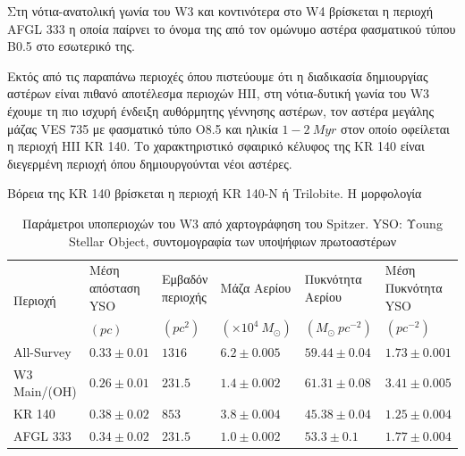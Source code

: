 \documentclass[a4paper,12pt]{memoir}
\newcommand{\e}[1]{\times 10^{#1}}
\begin{document}
Στη νότια-ανατολική γωνία του W3 και κοντινότερα στο W4 βρίσκεται η περιοχή AFGL 333 η οποία παίρνει το όνομα της από τον ομώνυμο αστέρα φασματικού τύπου B0.5 στο εσωτερικό της. 

Εκτός από τις παραπάνω περιοχές όπου πιστεύουμε ότι η διαδικασία δημιουργίας αστέρων είναι πιθανό αποτέλεσμα περιοχών HII, στη νότια-δυτική γωνία του W3 έχουμε τη πιο ισχυρή ένδειξη αυθόρμητης γέννησης αστέρων, τον αστέρα μεγάλης μάζας VES 735 με φασματικό τύπο O8.5 και ηλικία $1-2 \ Myr$ στον οποίο οφείλεται η περιοχή HII KR 140. Το χαρακτηριστικό σφαιρικό κέλυφος της KR 140 είναι διεγερμένη περιοχή όπου δημιουργούνται νέοι αστέρες. 

Βόρεια της KR 140 βρίσκεται η περιοχή KR 140-N ή Trilobite. Η μορφολογία 


\begin{table}
	\caption{Παράμετροι υποπεριοχών του W3 από χαρτογράφηση του Spitzer. YSO: Υoung Stellar Object, συντομογραφία των υποψήφιων πρωτοαστέρων}
	\begin{tabular}{p{} p{2.5cm} p{1.5cm} p{2cm} p{2.2cm} p{2.5cm}}
		\toprule
		\multirow{2}{*}{Περιοχή} & Μέση απόσταση YSO & Εμβαδόν περιοχής & Μάζα Αερίου & Πυκνότητα Αερίου & Μέση Πυκνότητα YSO \\ 
		&  $(pc)$ & $(pc^2)$ & $(\e{4} \ M_{\odot})$ & $(M_{\odot} \ pc^{-2})$ & $ (pc^{-2}) $ \\
		\midrule
		All-Survey & $0.33 \pm 0.01$ & $1316$ & $6.2\pm0.005$ & $59.44\pm 0.04$ & $1.73\pm 0.001$ \\
	  W3 Main/(OH) & $0.26 \pm 0.01$ & $231.5$ & $1.4\pm0.002$ & $61.31\pm 0.08$ & $3.41\pm 0.005$ \\
	  KR 140 & $0.38 \pm 0.02$ & $853$ & $3.8\pm0.004$ & $45.38\pm 0.04$ & $1.25\pm 0.004$ \\
	  AFGL 333 & $0.34 \pm 0.02$ & $231.5$ & $1.0\pm0.002$ & $53.3\pm 0.1$ & $1.77\pm 0.004$ \\  
		\bottomrule		
	\end{tabular}
\end{table}
\end{document}
